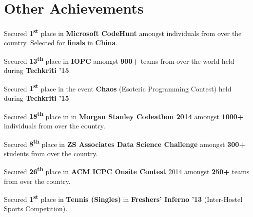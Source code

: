 \documentclass[a4paper]{norm-resume}
\begin{document}
\vspace{0.5mm}	%


\section{Other Achievements  \hrulefill}

\vspace{3mm} %

\begin{tightitemize}
	\item Secured \textbf{1\textsuperscript{st}} place in \textbf{Microsoft CodeHunt} amongst individuals from over the country. Selected for \textbf{finals} in \textbf{China}.
	\item Secured \textbf{13\textsuperscript{th}} place in \textbf{IOPC} amongst \textbf{900+} teams from over the world held during \textbf{Techkriti '15}.
	\item Secured \textbf{1\textsuperscript{st}} place in the event \textbf{Chaos} (Esoteric Programming Contest) held during \textbf{Techkriti '15}
	\item Secured \textbf{18\textsuperscript{th}} place in in \textbf{Morgan Stanley Codeathon 2014} amongst \textbf{1000+} individuals from over the country.
	\item Secured \textbf{8\textsuperscript{th}} place in \textbf{ZS Associates Data Science Challenge} amongst \textbf{300+} students from over the country.
	\item Secured \textbf{26\textsuperscript{th}} place in \textbf{ACM ICPC Onsite Contest} 2014 amongst \textbf{250+} teams from over the country.
	\item Secured \textbf{1\textsuperscript{st}} place in \textbf{Tennis (Singles)} in \textbf{Freshers' Inferno '13} (Inter-Hostel Sports Competition).
\end{tightitemize}
\end{document}
